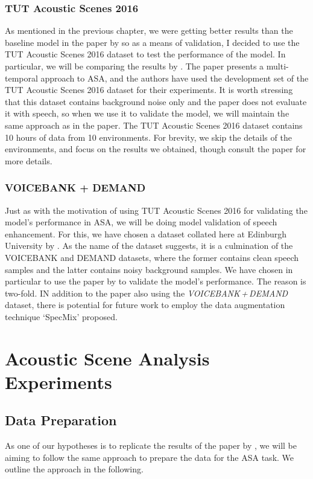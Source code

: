 \documentclass[logo,bsc,singlespacing,parskip,online]{infthesis}
\newcommand{\vbd}{\textit{VOICEBANK\,+\,DEMAND}\xspace}
\begin{document}
\subsection{TUT Acoustic Scenes 2016}
As mentioned in the previous chapter, we were getting better results than the baseline model in the paper by \citet{Huwel2020HearDS} 
so as a means of validation, I decided to use the TUT Acoustic Scenes 2016 dataset \citep{mesaros_tut_2016} to test the performance of the model.
In particular, we will be comparing the results by \citet{schindler_multi-temporal_2018}. The paper presents a multi-temporal approach to ASA, and 
the authors have used the development set of the TUT Acoustic Scenes 2016 dataset for their experiments. It is worth stressing 
that this dataset contains background noise only and the paper does not evaluate it with speech, so when we use it to validate 
the model, we will maintain the same approach as in the paper.
The TUT Acoustic Scenes 2016 dataset contains 10 hours of data from 10 environments.
For brevity, we skip the details of the environments, and focus on the results we obtained, though consult the paper for more details.

\subsection{VOICEBANK + DEMAND}
Just as with the motivation of using TUT Acoustic Scenes 2016 for validating the model's performance in ASA,
we will be doing model validation of speech enhancement. 
For this, we have chosen a dataset collated here at Edinburgh University by \citet{valentini-botinhao_speech_2016}. 
As the name of the dataset suggests, it is a culmination of the VOICEBANK \citep{voicebank} and DEMAND \citep{demand} datasets, 
where the former contains clean speech samples and the latter contains noisy background samples.
We have chosen in particular to use the paper by \citet{kim_specmix_2021} to validate the model's performance.
The reason is two-fold. IN addition to the paper also using the \vbd dataset,
there is potential for future work to employ the data augmentation technique `SpecMix' proposed.
\chapter{Acoustic Scene Analysis Experiments}
\label{chap:asa-experiments}
\section{Data Preparation}
\label{sec:data-preparation}
As one of our hypotheses is to replicate the results of the paper by \citet{Huwel2020HearDS}, 
we will be aiming to follow the same approach to prepare the data for the ASA task.
We outline the approach in the following.
\end{document}
